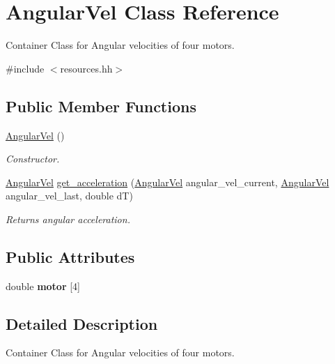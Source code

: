 \hypertarget{classAngularVel}{\section{\-Angular\-Vel \-Class \-Reference}
\label{classAngularVel}
}


\-Container \-Class for \-Angular velocities of four motors.  




{\ttfamily \#include $<$resources.\-hh$>$}

\subsection*{\-Public \-Member \-Functions}
\begin{DoxyCompactItemize}
\item 
\hypertarget{classAngularVel_ac2a344f43aa10a8ef2ef432752cd5f7a}{\hyperlink{classAngularVel_ac2a344f43aa10a8ef2ef432752cd5f7a}{\-Angular\-Vel} ()}\label{classAngularVel_ac2a344f43aa10a8ef2ef432752cd5f7a}

\begin{DoxyCompactList}\small\item\em \-Constructor. \end{DoxyCompactList}\item 
\hyperlink{classAngularVel}{\-Angular\-Vel} \hyperlink{classAngularVel_adb9bb615453cfa0614a54a61d98e73c0}{get\-\_\-acceleration} (\hyperlink{classAngularVel}{\-Angular\-Vel} angular\-\_\-vel\-\_\-current, \hyperlink{classAngularVel}{\-Angular\-Vel} angular\-\_\-vel\-\_\-last, double d\-T)
\begin{DoxyCompactList}\small\item\em \-Returns angular acceleration. \end{DoxyCompactList}\end{DoxyCompactItemize}
\subsection*{\-Public \-Attributes}
\begin{DoxyCompactItemize}
\item 
\hypertarget{classAngularVel_ab7a9eeef733d63a3cb811cf0a286b371}{double {\bfseries motor} \mbox{[}4\mbox{]}}\label{classAngularVel_ab7a9eeef733d63a3cb811cf0a286b371}

\end{DoxyCompactItemize}


\subsection{\-Detailed \-Description}
\-Container \-Class for \-Angular velocities of four motors. 

